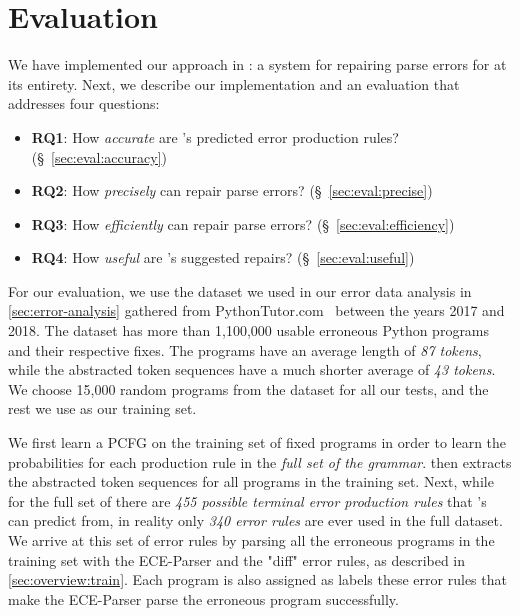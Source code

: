 \section{Evaluation}
\label{sec:eval}

We have implemented our approach in \toolname: a system for repairing parse
errors for \python at its entirety. Next, we describe our implementation and an
evaluation that addresses four questions:

\begin{itemize}
    \item \textbf{RQ1}: How \emph{accurate} are \toolname's predicted error production rules?
                        (\S~\ref{sec:eval:accuracy})
    \item \textbf{RQ2}: How \emph{precisely} can \toolname repair parse errors?
                        (\S~\ref{sec:eval:precise})
    \item \textbf{RQ3}: How \emph{efficiently} can \toolname repair parse errors?
                        (\S~\ref{sec:eval:efficiency})
    \item \textbf{RQ4}: How \emph{useful} are \toolname's suggested repairs?
                        (\S~\ref{sec:eval:useful})
\end{itemize}


For our evaluation, we use the \python dataset we used in our error data
analysis in \autoref{sec:error-analysis} gathered from
PythonTutor.com~\citep{Guo2013} between the years 2017 and 2018. The dataset has
more than 1,100,000 usable erroneous Python programs and their respective fixes.
The programs have an average length of \emph{87 tokens}, while the abstracted
token sequences have a much shorter average of \emph{43 tokens}. We choose
15,000 random programs from the dataset for all our tests, and the rest we use
as our training set.

We first learn a PCFG on the training set of fixed programs in order to learn
the probabilities for each production rule in the \emph{full set of the \python
grammar}. \toolname then extracts the abstracted token sequences for all
programs in the training set. Next, while for the full set of \python there are
\emph{455 possible terminal error production rules} that \toolname's can predict
from, in reality only \emph{340 error rules} are ever used in the full dataset.
We arrive at this set of error rules by parsing all the erroneous programs in
the training set with the ECE-Parser and the "diff" error rules, as described in
\autoref{sec:overview:train}. Each program is also assigned as labels these
error rules that make the ECE-Parser parse the erroneous program successfully.

